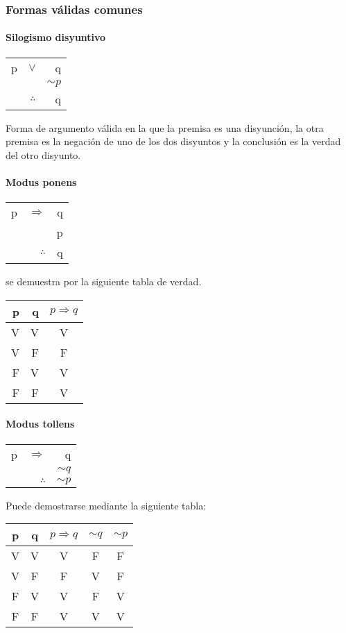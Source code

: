 \documentclass[10pt]{book} 						%
\begin{document}
\subsubsection{Formas válidas comunes}
\paragraph{Silogismo disyuntivo}
\begin{center}
\begin{tabular}{r r r}
p&$\lor$&q\\
&&$\sim p$\\
\hline
&$\therefore $&q\\
\end{tabular}
\end{center}
Forma de argumento válida en la que la premisa es una disyunción, la otra premisa es la negación de uno de los dos disyuntos y la conclusión es la verdad del otro disyunto.

\paragraph{Modus ponens}
\begin{center}
\begin{tabular}{r r r}
p & $\Rightarrow$ & q\\
&&p\\
\hline
&$\therefore$&q\\
\end{tabular}
\end{center}
se demuestra por la siguiente tabla de verdad.
\begin{center}
\begin{tabular}{r r c}
p&q&$p \Rightarrow q$\\
\hline
V&V&V\\
V&F&F\\
F&V&V\\
F&F&V\\
\end{tabular}
\end{center}

\paragraph{Modus tollens}
\begin{center}
\begin{tabular}{r r r}
p & $\Rightarrow$ & q\\
&&$\sim q$\\
\hline
&$\therefore$&$\sim p$\\
\end{tabular}
\end{center}
Puede demostrarse mediante la siguiente tabla:
\begin{center}
\begin{tabular}{c c c c c}
p & q &$p \Rightarrow q$&$\sim q$&$\sim p$\\
\hline
V&V&V&F&F\\
V&F&F&V&F\\
F&V&V&F&V\\
F&F&V&V&V\\
\end{tabular}
\end{center}
\end{document}
